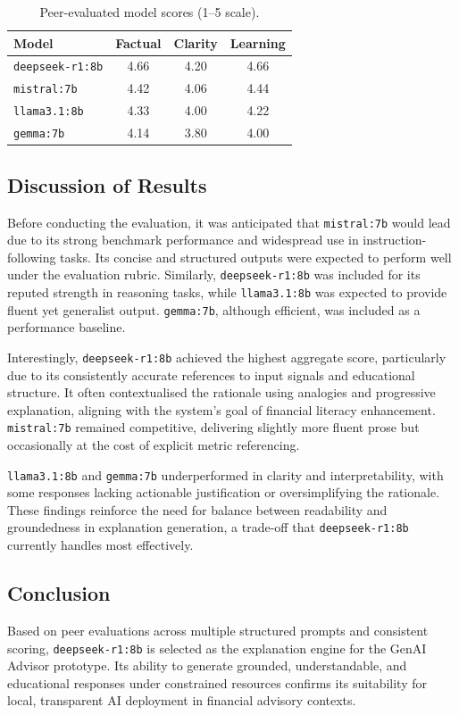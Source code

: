\begin{table}[ht]
\centering
\begin{tabular}{lccc}
\textbf{Model} & \textbf{Factual} & \textbf{Clarity} & \textbf{Learning} \\
\hline
\texttt{deepseek-r1:8b} & 4.66 & 4.20 & 4.66 \\
\texttt{mistral:7b}     & 4.42 & 4.06 & 4.44 \\
\texttt{llama3.1:8b}    & 4.33 & 4.00 & 4.22 \\
\texttt{gemma:7b}       & 4.14 & 3.80 & 4.00 \\
\end{tabular}
\caption{Peer-evaluated model scores (1–5 scale).}
\label{tab:model_scores}
\end{table}

\subsection{Discussion of Results}

Before conducting the evaluation, it was anticipated that \texttt{mistral:7b} would lead due to its strong benchmark performance and widespread use in instruction-following tasks. Its concise and structured outputs were expected to perform well under the evaluation rubric. Similarly, \texttt{deepseek-r1:8b} was included for its reputed strength in reasoning tasks, while \texttt{llama3.1:8b} was expected to provide fluent yet generalist output. \texttt{gemma:7b}, although efficient, was included as a performance baseline.

Interestingly, \texttt{deepseek-r1:8b} achieved the highest aggregate score, particularly due to its consistently accurate references to input signals and educational structure. It often contextualised the rationale using analogies and progressive explanation, aligning with the system's goal of financial literacy enhancement. \texttt{mistral:7b} remained competitive, delivering slightly more fluent prose but occasionally at the cost of explicit metric referencing.

\texttt{llama3.1:8b} and \texttt{gemma:7b} underperformed in clarity and interpretability, with some responses lacking actionable justification or oversimplifying the rationale. These findings reinforce the need for balance between readability and groundedness in explanation generation, a trade-off that \texttt{deepseek-r1:8b} currently handles most effectively.

\subsection{Conclusion}

Based on peer evaluations across multiple structured prompts and consistent scoring, \texttt{deepseek-r1:8b} is selected as the explanation engine for the GenAI Advisor prototype. Its ability to generate grounded, understandable, and educational responses under constrained resources confirms its suitability for local, transparent AI deployment in financial advisory contexts.
